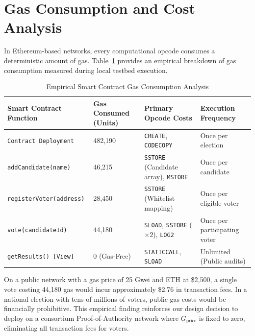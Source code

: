 \documentclass[12pt,a4paper]{report}
\begin{document}
\section{Gas Consumption and Cost Analysis}
In Ethereum-based networks, every computational opcode consumes a deterministic amount of gas. Table~\ref{tab:gas_analysis} provides an empirical breakdown of gas consumption measured during local testbed execution.

\begin{table}[H]
\centering
\caption{Empirical Smart Contract Gas Consumption Analysis}
\label{tab:gas_analysis}
\fontsize{8.5}{10.5}\selectfont
\begin{tabularx}{\textwidth}{p{4.0cm}p{3.2cm}p{3.5cm}X}
\toprule
\textbf{Smart Contract Function} & \textbf{Gas Consumed (Units)} & \textbf{Primary Opcode Costs} & \textbf{Execution Frequency} \\
\midrule
\texttt{Contract Deployment} & 482,190 & \texttt{CREATE}, \texttt{CODECOPY} & Once per election \\
\texttt{addCandidate(name)} & 46,215 & \texttt{SSTORE} (Candidate array), \texttt{MSTORE} & Once per candidate \\
\texttt{registerVoter(address)} & 28,450 & \texttt{SSTORE} (Whitelist mapping) & Once per eligible voter \\
\texttt{vote(candidateId)} & 44,180 & \texttt{SLOAD}, \texttt{SSTORE} ($\times 2$), \texttt{LOG2} & Once per participating voter \\
\texttt{getResults() [View]} & 0 (Gas-Free) & \texttt{STATICCALL}, \texttt{SLOAD} & Unlimited (Public audits) \\
\bottomrule
\end{tabularx}
\end{table}

On a public network with a gas price of 25 Gwei and ETH at \$2,500, a single vote costing 44,180 gas would incur approximately \$2.76 in transaction fees. In a national election with tens of millions of voters, public gas costs would be financially prohibitive. This empirical finding reinforces our design decision to deploy on a consortium Proof-of-Authority network where $G_{\text{price}}$ is fixed to zero, eliminating all transaction fees for voters.

\clearpage
\end{document}
